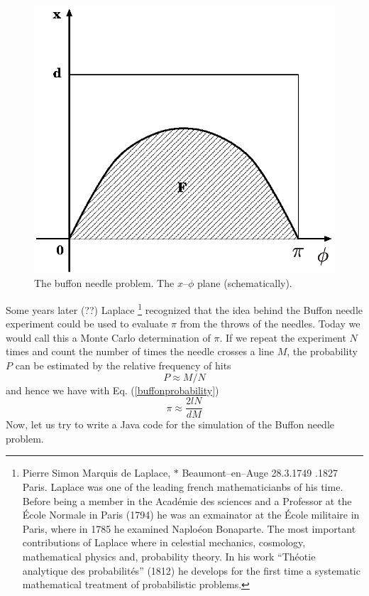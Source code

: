 \begin{figure}
\label{buffonplane}
\includegraphics[width=.8\textwidth]{Figures/buffonplane.eps}
\caption{The buffon needle problem. The $x$--$\phi$ plane (schematically).}
\end{figure}

Some years later (??) Laplace 
\footnote{Pierre Simon Marquis de Laplace, $\ast$ Beaumont--en--Auge
  28.3.1749 .1827 Paris. Laplace was one of the leading french
  mathematicianbs of his time. Before being a member in the Acad\'emie
  des sciences and a Professor at the \'Ecole Normale in Paris (1794)
he was an exmainator at the \'Ecole militaire in Paris, where in 1785
he examined Naplo\'eon Bonaparte. The most important contributions of
Laplace where in celestial mechanics, cosmology, mathematical physics
and, probability theory. In his work ``Th\'eotie analytique des
probabilit\'es'' (1812) he develops  for the first time a systematic
mathematical treatment of probabilistic problems.} recognized that
the idea behind the Buffon needle experiment could be used to evaluate
$\pi$ from the throws of the needles. Today we would call this a
Monte Carlo determination of $\pi$. If we repeat the experiment $N$
times and count the number of times the needle crosses a line $M$, the
probability $P$ can be estimated by the relative frequency of hits
\begin{equation}
\label{buffonestimateP}
P \approx M/N
\end{equation}
and hence we have with Eq. (\ref{buffonprobability})
\begin{equation}
\pi \approx \frac{2lN}{dM}
\end{equation}
Now, let us try to write a Java code for the simulation of the Buffon
needle problem.

